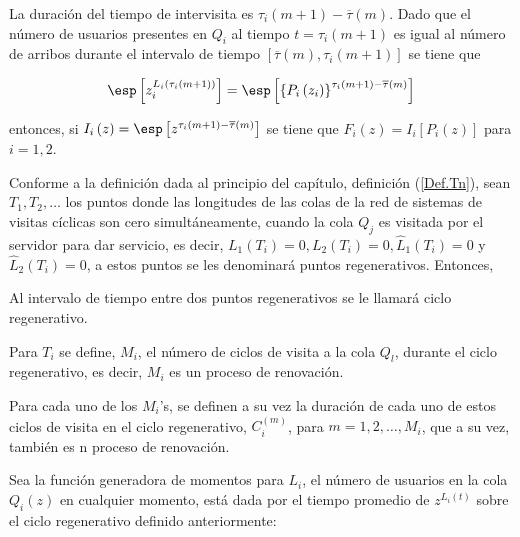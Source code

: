 La duraci\'on del tiempo de intervisita es $\tau_{i}\left(m+1\right)-\overline{\tau}\left(m\right)$. Dado que el n\'umero de usuarios presentes en $Q_{i}$ al tiempo $t=\tau_{i}\left(m+1\right)$ es igual al n\'umero de arribos durante el intervalo de tiempo $\left[\overline{\tau}\left(m\right),\tau_{i}\left(m+1\right)\right]$ se tiene que


\begin{eqnarray*}
\esp\left[z_{i}^{L_{i}\left(\tau_{i}\left(m+1\right)\right)}\right]=\esp\left[\left\{P_{i}\left(z_{i}\right)\right\}^{\tau_{i}\left(m+1\right)-\overline{\tau}\left(m\right)}\right]
\end{eqnarray*}

entonces, si $I_{i}\left(z\right)=\esp\left[z^{\tau_{i}\left(m+1\right)-\overline{\tau}\left(m\right)}\right]$
se tiene que $F_{i}\left(z\right)=I_{i}\left[P_{i}\left(z\right)\right]$
para $i=1,2$.

Conforme a la definici\'on dada al principio del cap\'itulo, definici\'on (\ref{Def.Tn}), sean $T_{1},T_{2},\ldots$ los puntos donde las longitudes de las colas de la red de sistemas de visitas c\'iclicas son cero simult\'aneamente, cuando la cola $Q_{j}$ es visitada por el servidor para dar servicio, es decir, $L_{1}\left(T_{i}\right)=0,L_{2}\left(T_{i}\right)=0,\hat{L}_{1}\left(T_{i}\right)=0$ y $\hat{L}_{2}\left(T_{i}\right)=0$, a estos puntos se les denominar\'a puntos regenerativos. Entonces, 

\begin{Def}
Al intervalo de tiempo entre dos puntos regenerativos se le llamar\'a ciclo regenerativo.
\end{Def}

\begin{Def}
Para $T_{i}$ se define, $M_{i}$, el n\'umero de ciclos de visita a la cola $Q_{l}$, durante el ciclo regenerativo, es decir, $M_{i}$ es un proceso de renovaci\'on.
\end{Def}

\begin{Def}
Para cada uno de los $M_{i}$'s, se definen a su vez la duraci\'on de cada uno de estos ciclos de visita en el ciclo regenerativo, $C_{i}^{(m)}$, para $m=1,2,\ldots,M_{i}$, que a su vez, tambi\'en es n proceso de renovaci\'on.
\end{Def}


Sea la funci\'on generadora de momentos para $L_{i}$, el n\'umero de usuarios en la cola $Q_{i}\left(z\right)$ en cualquier momento, est\'a dada por el tiempo promedio de $z^{L_{i}\left(t\right)}$ sobre el ciclo regenerativo definido anteriormente:

